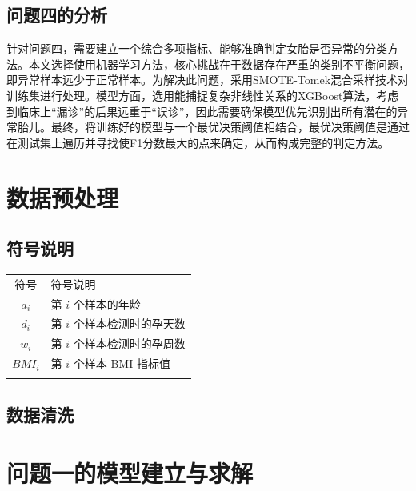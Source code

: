 \documentclass[a4paper, oneside, 12pt]{article}
\begin{document}
\subsection{问题四的分析}
针对问题四，需要建立一个综合多项指标、能够准确判定女胎是否异常的分类方法。本文选择使用机器学习方法，核心挑战在于数据存在严重的类别不平衡问题，即异常样本远少于正常样本。为解决此问题，采用SMOTE-Tomek混合采样技术对训练集进行处理。模型方面，选用能捕捉复杂非线性关系的XGBoost算法，考虑到临床上“漏诊”的后果远重于“误诊”，因此需要确保模型优先识别出所有潜在的异常胎儿。最终，将训练好的模型与一个最优决策阈值相结合，最优决策阈值是通过在测试集上遍历并寻找使F1分数最大的点来确定，从而构成完整的判定方法。

\newpage

\section{数据预处理}

\subsection{符号说明}

\begin{center}
    \begin{tabularx}{0.7\textwidth}{c@{\hspace{1pc}}|@{\hspace{2pc}}>{\centering\arraybackslash}X}
        \Xhline{0.08em}
        符号      & 符号说明              \\
        \Xhline{0.05em}
        $a_i$   & 第 $i$ 个样本的年龄      \\
        $d_i$   & 第 $i$ 个样本检测时的孕天数  \\
        $w_i$   & 第 $i$ 个样本检测时的孕周数  \\
        $BMI_i$ & 第 $i$ 个样本 BMI 指标值 \\
        \Xhline{0.08em}
    \end{tabularx}
\end{center}

\subsection{数据清洗}



\section{问题一的模型建立与求解}
\end{document}
